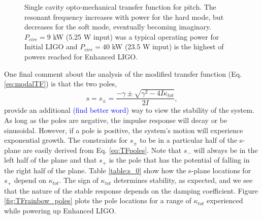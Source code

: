 \begin{figure}
\begin{centering}
\caption[Single cavity opto-mechanical transfer function]{Single
  cavity opto-mechanical transfer function for pitch. The resonant
  frequency increases with power for the hard mode, but decreases for
  the soft mode, eventually becoming imaginary. $P_{circ} = 9$ kW
  (5.25 W input) was a typical operating power for Initial LIGO and
  $P_{circ} = 40$ kW (23.5 W input) is the highest of powers reached
  for Enhanced LIGO.}
\label{fig:optomechhardsoft}
\end{centering}
\end{figure}


One final comment about the analysis of the modified transfer function
(Eq. \ref{eq:modalTF}) is that the two poles,
\begin{equation}
s = s_\pm = \frac{-\gamma \pm \sqrt{\gamma^2 - 4 I \kappa_{tot}}}{2 I},
\label{eq:TFpoles}
\end{equation}
provide an additional \textcolor{blue}{(find better word)} way to view
the stability of the system. As long as the poles are negative, the
impulse response will decay or be sinusoidal. However, if a pole is
positive, the system's motion will experience exponential growth. The
constraints for $s_\pm$ to be in a particular half of the s-plane are
easily derived from Eq. \ref{eq:TFpoles}. Note that $s_-$ will always
be in the left half of the plane and that $s_+$ is the pole that has
the potential of falling in the right half of the plane. Table
\ref{table:s_0} show how the s-plane locations for $s_+$ depend on
$\kappa_{tot}$. The sign of $\kappa_{tot}$ determines stability, as
expected, and we see that the nature of the stable response depends on
the damping coefficient. Figure \ref{fig:TFrainbow_poles} plots the
pole locations for a range of $\kappa_{tot}$ experienced while
powering up Enhanced LIGO.

